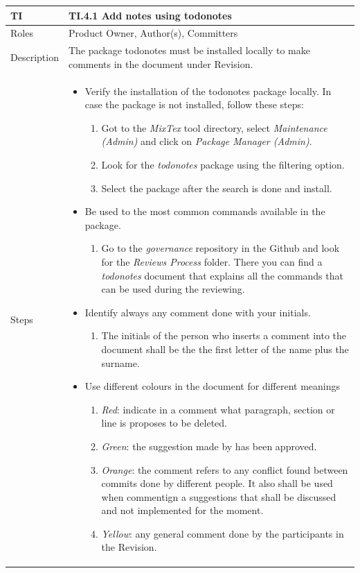 \documentclass{template/openetcs_article}
\begin{document}
\begin{flushleft}
\tablefirsthead{}
\tablehead{}
\tabletail{}
\tablelasttail{}
\begin{supertabular}{|m{2cm}|m{13cm}|}
\hline
{}
TI & 
TI.4.1 Add notes using todonotes
\\\hline
Roles &
Product Owner, Author(s), Committers
\\\hline
Description &
The package todonotes must be installed locally to make comments in the document under Revision. 
\\\hline
Steps &
\begin{itemize}
\item Verify the installation of the todonotes package locally. In case the package is not installed, follow these steps:
\begin{enumerate}
\item Got to the {\it MixTex} tool directory, select {\it Maintenance (Admin)} and click on {\it Package Manager (Admin)}.
\item Look for the {\it todonotes} package using the filtering option.
\item Select the package after the search is done and install.
\end{enumerate}
\item Be used to the most common commands available in the package.
\begin{enumerate}
\item Go to the {\it governance} repository in the Github and look for the {\it Reviews Process} folder. There you can find a {\it todonotes} document that explains all the commands that can be used during the reviewing.
\end{enumerate}
\item Identify always any comment done with your initials.
\begin{enumerate} 
\item The initials of the person who inserts a comment into the document shall be the the first letter of the name plus the surname.
\end{enumerate}
\item Use different colours in the document for different meanings 
\begin{enumerate}
\item {\it Red}: indicate in a comment what paragraph, section or line is proposes to be deleted. 
\item {\it Green}: the suggestion made by has been approved.
\item {\it Orange}: the comment refers to any conflict found between commits done by different people. It also shall be used when commentign a suggestions that shall be discussed and not implemented for the moment.
\item {\it Yellow}: any general comment done by the participants in the Revision. 
\end{enumerate} 
\end{itemize}

\\\hline
\end{supertabular}
\end{flushleft}
\end{document}
